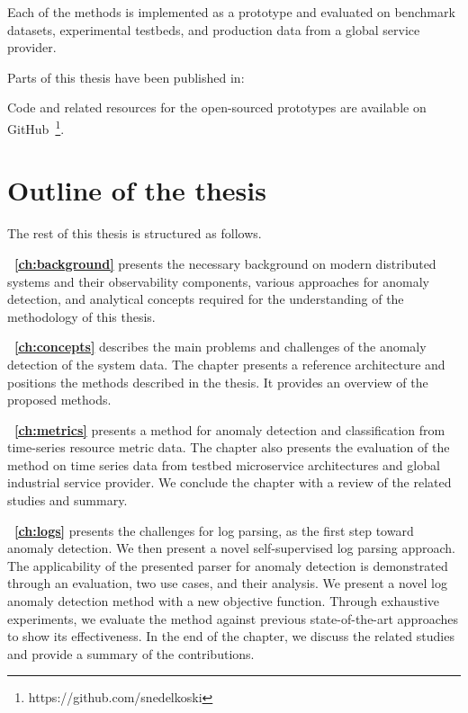 Each of the methods is implemented as a prototype and evaluated on benchmark datasets, experimental testbeds, and production data from a global service provider. 

Parts of this thesis have been published in:\\
\sloppy{
\begin{refsection} %
\nocite{nedelkoski2020loganomaly,nedelkoski2020selfsupervised,nedelkoski2020selftracing,nedelkoski2019anomaly,nedelkoski2019anomalymultimodal,nedelkoski2020patent,nedelkoski2019distributions,nedelkoski2020data,nedelkoski2020jointmodalities,nedelkoski2019edge,nedelkoski2020patentjasmin,nedelkoski2020rca,nedelkoski2020kevin,nedelkoski2020simplenetwork,nedelkoski2020mary}

\printbibliography[heading=none] %
\end{refsection}
}

Code and related resources for the open-sourced prototypes are available on GitHub~\footnote{https://github.com/snedelkoski}.

\section{Outline of the thesis}\label{ch:introduction:sec:outline}

The rest of this thesis is structured as follows.

\textbf{~\autoref{ch:background}} presents the necessary background on modern distributed systems and their observability components, various approaches for anomaly detection, and analytical concepts required for the understanding of the methodology of this thesis.

\textbf{~\autoref{ch:concepts}} describes the main problems and challenges of the anomaly detection of the system data. The chapter presents a reference architecture and positions the methods described in the thesis. It provides an overview of the proposed methods.

\textbf{~\autoref{ch:metrics}} presents a method for anomaly detection and classification from time-series resource metric data. The chapter also presents the evaluation of the method on time series data from testbed microservice architectures and global industrial service provider. We conclude the chapter with a review of the related studies and summary.

\textbf{~\autoref{ch:logs}} presents the challenges for log parsing, as the first step toward anomaly detection. We then present a novel self-supervised log parsing approach. The applicability of the presented parser for anomaly detection is demonstrated through an evaluation, two use cases, and their analysis. We present a novel log anomaly detection method with a new objective function. Through exhaustive experiments, we evaluate the method against previous state-of-the-art approaches to show its effectiveness. In the end of the chapter, we discuss the related studies and provide a summary of the contributions.

